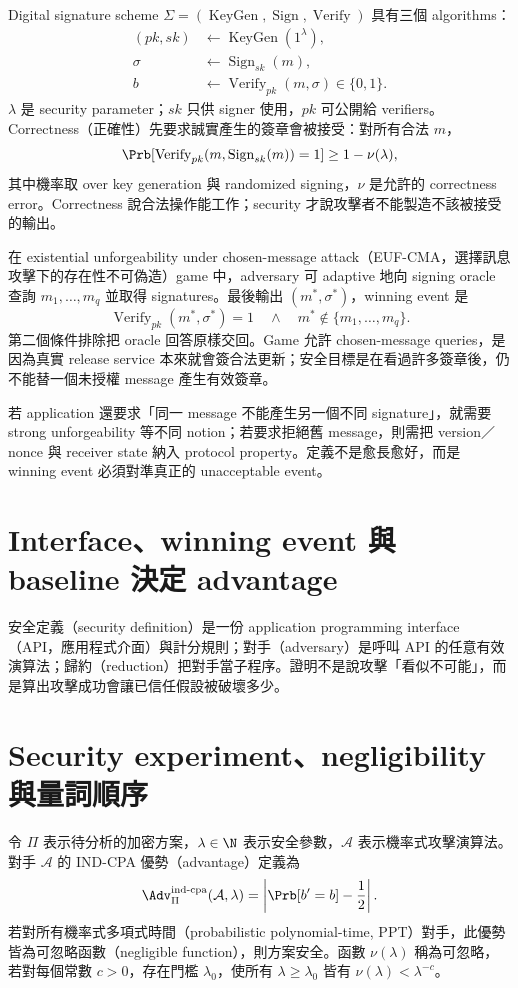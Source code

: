 \documentclass[11pt,a4paper,oneside,openany]{book}
\begin{document}
Digital signature scheme $\Sigma=(\operatorname{KeyGen},\operatorname{Sign},\operatorname{Verify})$ 具有三個 algorithms：
\begin{align*}
 (pk,sk)&\gets\operatorname{KeyGen}(1^\lambda),\\
 \sigma&\gets\operatorname{Sign}_{sk}(m),\\
 b&\gets\operatorname{Verify}_{pk}(m,\sigma)\in\{0,1\}.
\end{align*}
$\lambda$ 是 security parameter；$sk$ 只供 signer 使用，$pk$ 可公開給 verifiers。Correctness（正確性）先要求誠實產生的簽章會被接受：對所有合法 $m$，
\[
 \Prb[\operatorname{Verify}_{pk}(m,\operatorname{Sign}_{sk}(m))=1]
 \ge 1-\nu(\lambda),
\]
其中機率取 over key generation 與 randomized signing，$\nu$ 是允許的 correctness error。Correctness 說合法操作能工作；security 才說攻擊者不能製造不該被接受的輸出。

在 existential unforgeability under chosen-message attack（EUF-CMA，選擇訊息攻擊下的存在性不可偽造）game 中，adversary 可 adaptive 地向 signing oracle 查詢 $m_1,\ldots,m_q$ 並取得 signatures。最後輸出 $(m^*,\sigma^*)$，winning event 是
\begin{equation}
 \operatorname{Verify}_{pk}(m^*,\sigma^*)=1
 \quad\land\quad
 m^*\notin\{m_1,\ldots,m_q\}.
 \label{eq:euf-cma-win}
\end{equation}
第二個條件排除把 oracle 回答原樣交回。Game 允許 chosen-message queries，是因為真實 release service 本來就會簽合法更新；安全目標是在看過許多簽章後，仍不能替一個未授權 message 產生有效簽章。

若 application 還要求「同一 message 不能產生另一個不同 signature」，就需要 strong unforgeability 等不同 notion；若要求拒絕舊 message，則需把 version／nonce 與 receiver state 納入 protocol property。定義不是愈長愈好，而是 winning event 必須對準真正的 unacceptable event。

\section{Interface、winning event 與 baseline 決定 advantage}
\begin{coreintuition}
安全定義（security definition）是一份 application programming interface（API，應用程式介面）與計分規則；對手（adversary）是呼叫 API 的任意有效演算法；歸約（reduction）把對手當子程序。證明不是說攻擊「看似不可能」，而是算出攻擊成功會讓已信任假設被破壞多少。
\end{coreintuition}

\section{Security experiment、negligibility 與量詞順序}
令 $\Pi$ 表示待分析的加密方案，$\lambda\in\N$ 表示安全參數，$\mathcal A$ 表示機率式攻擊演算法。對手 $\mathcal A$ 的 IND-CPA 優勢（advantage）定義為
\[
 \Adv^{\mathrm{ind\text{-}cpa}}_{\Pi}(\mathcal A,\lambda)
 =\left|\Prb[b'=b]-\frac12\right|.
\]
若對所有機率式多項式時間（probabilistic polynomial-time, PPT）對手，此優勢皆為可忽略函數（negligible function），則方案安全。函數 $\nu(\lambda)$ 稱為可忽略，若對每個常數 $c>0$，存在門檻 $\lambda_0$，使所有 $\lambda\ge\lambda_0$ 皆有 $\nu(\lambda)<\lambda^{-c}$。
\end{document}
